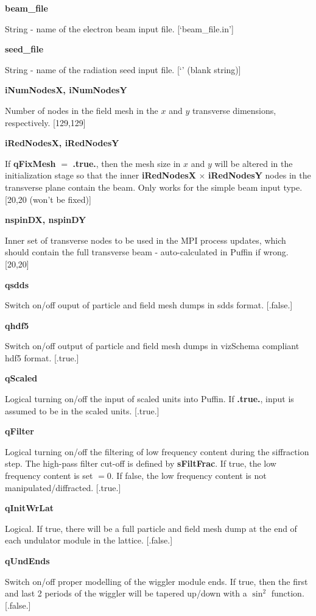 \documentclass[12pt]{article}%
\begin{document}
{\bf beam\_file}

String - name of the electron beam input file. [`beam\_file.in']

{\bf seed\_file}

String - name of the radiation seed input file. [`' (blank string)]

{\bf iNumNodesX, iNumNodesY}

Number of nodes in the field mesh in the $x$ and $y$ transverse dimensions, respectively. [129,129]

{\bf iRedNodesX, iRedNodesY}

If {\bf qFixMesh} $=$ {\bf .true.}, then the mesh size in $x$ and $y$ will be altered in the initialization stage so that the inner {\bf iRedNodesX} $\times$ {\bf iRedNodesY} nodes in the transverse plane contain the beam. Only works for the simple beam input type. [20,20 (won't be fixed)]



{\bf nspinDX, nspinDY}

Inner set of transverse nodes to be used in the MPI process updates, which should contain the full transverse beam - auto-calculated in Puffin if wrong. [20,20]

{\bf qsdds}

Switch on/off ouput of particle and field mesh dumps in sdds format. [.false.]

{\bf qhdf5}

Switch on/off output of particle and field mesh dumps in vizSchema compliant hdf5 format. [.true.]

{\bf qScaled}

Logical turning on/off the input of scaled units into Puffin. If {\bf .true.}, input is assumed to be in the scaled units. [.true.]

{\bf qFilter}

Logical turning on/off the filtering of low frequency content during the siffraction step. The high-pass filter cut-off is defined by {\bf sFiltFrac}. If true, the low frequency content is set $=0$. If false, the low frequency content is not manipulated/diffracted. [.true.]

{\bf qInitWrLat}

Logical. If true, there will be a full particle and field mesh dump at the end of each undulator module in the lattice. [.false.]

{\bf qUndEnds}

Switch on/off proper modelling of the wiggler module ends. If true, then the first and last 2 periods of the wiggler will be tapered up/down with a $\sin^2$ function. [.false.]
\end{document}
